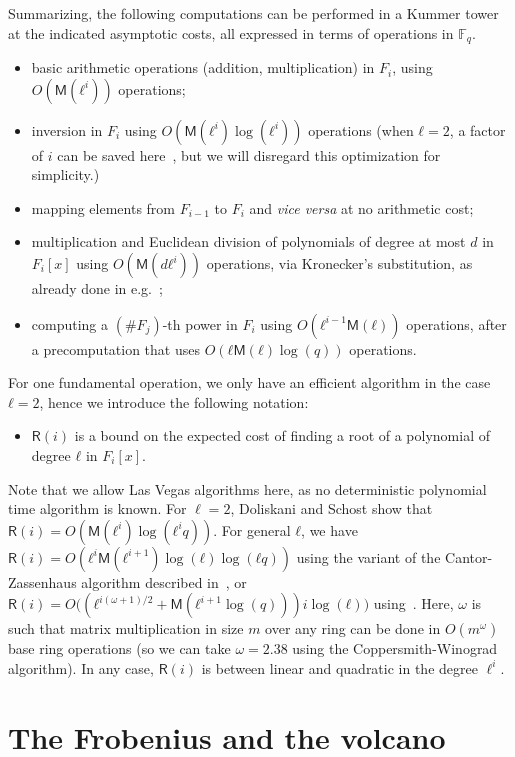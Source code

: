 \documentclass{lms}
\def\cout#1{\mathsf{#1}}
\newcommand{\F}{\mathbb{F}}
\newcommand{\MM}{\cout{M}}
\newcommand{\RR}{\cout{R}}
\begin{document}
Summarizing, the following computations can be performed
in a Kummer tower at the indicated asymptotic costs, all expressed in 
terms of operations in $\F_q$.
\begin{itemize}
\item basic arithmetic operations (addition, multiplication) in $F_i$,
  using $O(\MM(ℓ^i))$ operations;
\item inversion in $F_i$ using $O(\MM(ℓ^i)\log(ℓ^i))$
  operations (when $ℓ=2$, a factor of $i$ can be saved
    here~\cite{DoSc12}, but we will disregard this optimization for
    simplicity.)
\item mapping elements from $F_{i-1}$ to $F_i$ and \emph{vice versa}
  at no arithmetic cost;
\item multiplication and Euclidean division of polynomials of degree
  at most $d$ in $F_i[x]$ using $O(\MM(dℓ^i))$ operations, via
  Kronecker's
  substitution, as already done in e.g.~\cite{vzgathen+shoup92};
\item computing a $(\#F_j)$-th power in $F_i$ using $O(ℓ^{i-1}\MM(ℓ))$
  operations, after a precomputation that uses $O(ℓ\MM(ℓ)\log(q))$
  operations.
\end{itemize}

For one fundamental operation, we only have an efficient algorithm in
the case $ℓ=2$, hence we introduce the following notation:
\begin{itemize}
\item $\RR(i)$ is a bound on the expected cost of finding a root of a polynomial of degree
  $ℓ$ in $F_i[x]$.
\end{itemize}
Note that we allow Las Vegas algorithms here, as no deterministic polynomial
time algorithm is known. For $\ell=2$, Doliskani and Schost show that
$\RR(i)=O(\MM(ℓ^i)\log(ℓ^iq))$. For general $ℓ$, we have
$\RR(i)=O(ℓ^i\MM(ℓ^{i+1})\log(ℓ)\log(ℓq))$ using the variant of the
Cantor-Zassenhaus algorithm described in~\cite[Chapter~14.5]{vzGG}, or
$\RR(i)=O\bigl((ℓ^{i(ω+1)/2}+\MM(ℓ^{i+1}\log (q)))i\log(ℓ)\bigr)$
using~\cite{kaltofen+shoup97}. Here, $\omega$ is such that matrix
multiplication in size $m$ over any ring can be done in $O(m^\omega)$
base ring operations (so we can take $\omega =2.38$ using the 
Coppersmith-Winograd algorithm). In any case, $\RR(i)$ is between 
linear and quadratic in the degree $\ell^{i}$.

\section{The Frobenius and the volcano}
\label{sec:isogeny-volcanoes}
\end{document}
